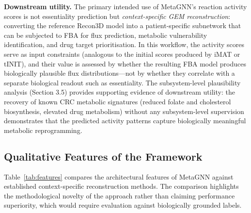 \documentclass[12pt,a4paper]{article}
\begin{document}
\textbf{Downstream utility.} The primary intended use of MetaGNN's reaction activity scores is not essentiality prediction but \textit{context-specific GEM reconstruction}: converting the reference Recon3D model into a patient-specific subnetwork that can be subjected to FBA for flux prediction, metabolic vulnerability identification, and drug target prioritisation. In this workflow, the activity scores serve as input constraints (analogous to the initial scores produced by iMAT or tINIT), and their value is assessed by whether the resulting FBA model produces biologically plausible flux distributions---not by whether they correlate with a separate biological readout such as essentiality. The subsystem-level plausibility analysis (Section 3.5) provides supporting evidence of downstream utility: the recovery of known CRC metabolic signatures (reduced folate and cholesterol biosynthesis, elevated drug metabolism) without any subsystem-level supervision demonstrates that the predicted activity patterns capture biologically meaningful metabolic reprogramming.

\subsection{Qualitative Features of the Framework}

Table~\ref{tab:features} compares the architectural features of MetaGNN against established context-specific reconstruction methods. The comparison highlights the methodological novelty of the approach rather than claiming performance superiority, which would require evaluation against biologically grounded labels.
\end{document}
